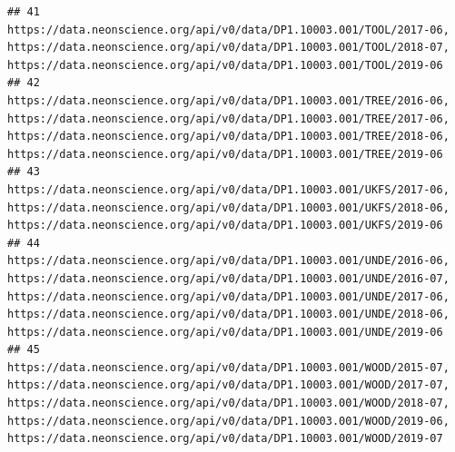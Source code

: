 \documentclass[]{book}
\begin{document}
\begin{verbatim}
## 41                                                                                                                                                                                                                                                                                                                                                                                                                               https://data.neonscience.org/api/v0/data/DP1.10003.001/TOOL/2017-06, https://data.neonscience.org/api/v0/data/DP1.10003.001/TOOL/2018-07, https://data.neonscience.org/api/v0/data/DP1.10003.001/TOOL/2019-06
## 42                                                                                                                                                                                                                                                                                                                                                          https://data.neonscience.org/api/v0/data/DP1.10003.001/TREE/2016-06, https://data.neonscience.org/api/v0/data/DP1.10003.001/TREE/2017-06, https://data.neonscience.org/api/v0/data/DP1.10003.001/TREE/2018-06, https://data.neonscience.org/api/v0/data/DP1.10003.001/TREE/2019-06
## 43                                                                                                                                                                                                                                                                                                                                                                                                                               https://data.neonscience.org/api/v0/data/DP1.10003.001/UKFS/2017-06, https://data.neonscience.org/api/v0/data/DP1.10003.001/UKFS/2018-06, https://data.neonscience.org/api/v0/data/DP1.10003.001/UKFS/2019-06
## 44                                                                                                                                                                                                                                                                                     https://data.neonscience.org/api/v0/data/DP1.10003.001/UNDE/2016-06, https://data.neonscience.org/api/v0/data/DP1.10003.001/UNDE/2016-07, https://data.neonscience.org/api/v0/data/DP1.10003.001/UNDE/2017-06, https://data.neonscience.org/api/v0/data/DP1.10003.001/UNDE/2018-06, https://data.neonscience.org/api/v0/data/DP1.10003.001/UNDE/2019-06
## 45                                                                                                                                                                                                                                                                                     https://data.neonscience.org/api/v0/data/DP1.10003.001/WOOD/2015-07, https://data.neonscience.org/api/v0/data/DP1.10003.001/WOOD/2017-07, https://data.neonscience.org/api/v0/data/DP1.10003.001/WOOD/2018-07, https://data.neonscience.org/api/v0/data/DP1.10003.001/WOOD/2019-06, https://data.neonscience.org/api/v0/data/DP1.10003.001/WOOD/2019-07

\end{verbatim}
\end{document}
